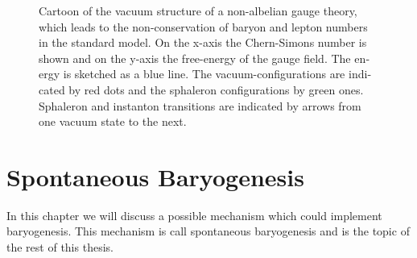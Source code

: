 \documentclass[master,       %
               twoside,        %
               BCOR10mm,       %
               english,ngerman, %
               ]{GAUBM}
\begin{document}
\begin{otherlanguage}{english}
\begin{figure}[H]
	\centering
	\caption{Cartoon of the vacuum structure of a non-albelian gauge theory, which leads to the non-conservation of baryon and lepton numbers in the standard model.
		On the x-axis the Chern-Simons number is shown and on the y-axis the free-energy of the gauge field.
		The energy is sketched as a blue line. The vacuum-configurations are indicated by red dots and the sphaleron configurations by green ones. Sphaleron and instanton transitions are indicated by arrows from one vacuum state
		to the next.
	}
	\label{fig:sphaleron_cartoon}
\end{figure}


\chapter{Spontaneous Baryogenesis}
\label{sec:spontaneous_baryogenesis}
\label{sec:sbg}

In this chapter we will discuss a possible mechanism which could implement baryogenesis. This mechanism is call spontaneous baryogenesis and is the topic of the rest of this thesis.


\end{otherlanguage}
\end{document}
